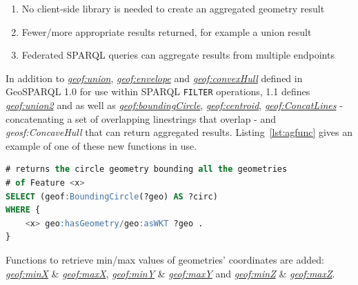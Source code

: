 \documentclass[runningheads]{llncs}
\begin{document}
\begin{enumerate}
    \item No client-side library is needed to create an aggregated geometry result
    \item Fewer/more appropriate results returned, for example a union result
    \item Federated SPARQL queries can aggregate results from multiple endpoints
\end{enumerate}

In addition to \href{http://www.opengis.net/def/function/geosparql/union}{\emph{geof:union}}, \href{http://www.opengis.net/def/function/geosparql/envelope}{\emph{geof:envelope}} and \href{http://www.opengis.net/def/function/geosparql/convexHull}{\emph{geof:convexHull}} defined in GeoSPARQL 1.0 
for use within SPARQL \texttt{FILTER} operations, 1.1 defines \href{http://www.opengis.net/def/function/geosparql/union2}{\emph{geof:union2}} and 
as well as \href{http://www.opengis.net/def/function/geosparql/boundingCircle}{\emph{geof:boundingCircle}}, \href{http://www.opengis.net/def/function/geosparql/centroid}{\emph{geof:centroid}}, \href{http://www.opengis.net/def/function/geosparql/concatLines}{\emph{geof:ConcatLines}} - concatenating a set of overlapping linestrings 
that overlap - and \emph{geosf:ConcaveHull} that can return aggregated results. Listing~\ref{lst:agfunc} gives an example 
of one of these new functions in use.
\small
\begin{lstlisting}[caption=Aggregation Function example SPARQL query,label=lst:agfunc,language=sql,frame=single,basicstyle=\ttfamily,showstringspaces=false]
# returns the circle geometry bounding all the geometries 
# of Feature <x>
SELECT (geof:BoundingCircle(?geo) AS ?circ)
WHERE {
    <x> geo:hasGeometry/geo:asWKT ?geo .
}
\end{lstlisting}
\normalsize

Functions to retrieve min/max values of geometries' coordinates are added: \href{http://www.opengis.net/def/function/geosparql/minX}{\emph{geof:minX}} \& \href{http://www.opengis.net/def/function/geosparql/maxX}{\emph{geof:maxX}},
\href{http://www.opengis.net/def/function/geosparql/minY}{\emph{geof:minY}} \& \href{http://www.opengis.net/def/function/geosparql/maxY}{\emph{geof:maxY}} and \href{http://www.opengis.net/def/function/geosparql/minZ}{\emph{geof:minZ}} \& \href{http://www.opengis.net/def/function/geosparql/maxZ}{\emph{geof:maxZ}}.
\end{document}
